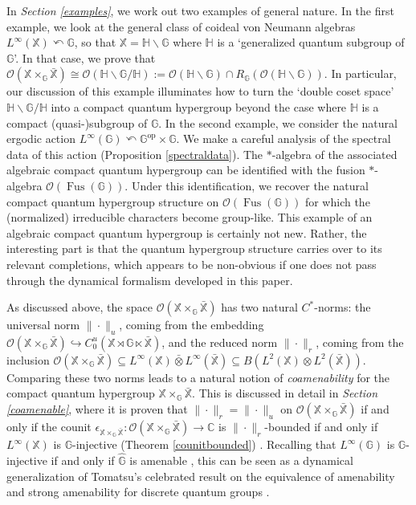 \documentclass[reqno]{amsart}
\numberwithin{equation}{section}
\newcommand\XGX{\X\times_\G \bar{\X}}
\newcommand\XrX{\X\rtimes\G \ltimes\bar{\X}}
\newcommand{\op}{\mathrm{op}}
\renewcommand{\H}{\mathbb{H}}
\newcommand{\mcO}{\mathcal{O}}
\newcommand{\C}{\mathbb{C}}
\newcommand{\G}{\mathbb{G}}
\newcommand{\X}{\mathbb{X}}
\newcommand{\ovot}{\bar{\otimes}}
\begin{document}
In \emph{Section \ref{examples}}, we work out two examples of general nature. In the first example, we look at the general class of coideal von Neumann algebras $L^\infty(\X)\curvearrowleft \G$, so that $\X= \H \backslash \G$ where $\H$ is a `generalized quantum subgroup of $\G$'. In that case, we prove that $\mcO(\XGX)\cong \mcO(\H\backslash \G/\H):=\mcO(\H\backslash \G)\cap R_\G(\mcO(\H\backslash \G))$. In particular, our discussion of this example illuminates how to turn the `double coset space' $\H\backslash \G/\H$ into a compact quantum hypergroup beyond the case where $\H$ is a compact (quasi-)subgroup of $\G$. In the second example, we consider the natural ergodic action $L^\infty(\G)\curvearrowleft \G^{\op}\times \G$. We make a careful analysis of the spectral data of this action (Proposition \ref{spectraldata}). The  $*$-algebra of the associated algebraic compact quantum hypergroup can be identified with the fusion $*$-algebra $\mcO(\operatorname{Fus}(\G))$. Under this identification, we recover the natural compact quantum hypergroup structure on $\mcO(\operatorname{Fus}(\G))$ for which the (normalized) irreducible characters become group-like. This example of an algebraic compact quantum hypergroup is certainly not new. Rather, the interesting part is that the quantum hypergroup structure carries over to its relevant completions, which appears to be non-obvious if one does not pass through the dynamical formalism developed in this paper. 

As discussed above, the space $\mcO(\XGX)$ has two natural $C^*$-norms: the universal norm $\|\cdot\|_u$, coming from the embedding $\mcO(\XGX)\hookrightarrow C_0^u(\XrX)$, and the reduced norm $\|\cdot\|_r$, coming from the inclusion $\mcO(\XGX)\subseteq L^\infty(\X)\ovot L^\infty(\bar{\X})\subseteq B(L^2(\X)\otimes L^2(\bar{\X}))$. Comparing these two norms leads to a natural notion of \emph{coamenability} for the compact quantum hypergroup $\XGX$. This is discussed in detail in \emph{Section \ref{coamenable}}, where it is proven that $\|\cdot\|_r= \|\cdot\|_u$ on $\mcO(\XGX)$ if and only if the counit $\epsilon_{\XGX}: \mcO(\XGX)\to \C$ is $\|\cdot\|_r$-bounded if and only if $L^\infty(\X)$ is $\G$-injective (Theorem \ref{counitbounded}) . Recalling that $L^\infty(\G)$ is $\G$-injective if and only if $\hat{\G}$ is amenable \cites{Cr17, DH24, DR26}, this can be seen as a dynamical generalization of Tomatsu's celebrated result on the equivalence of amenability and strong amenability for discrete quantum groups \cite{Tom06}.
\end{document}
